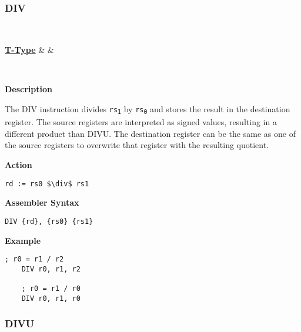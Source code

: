 \subsubsection{DIV }\label{sec:DIV}

\vspace{3ex}

\begin{center}
	\begin{bytefield}[leftcurly=., leftcurlyspace=0pt]{32}
		 \\
		\begin{leftwordgroup}{\hyperref[sec:t-type]{\textbf{T-Type}}}
		 & 
		 &
		\end{leftwordgroup}\\
	\end{bytefield}
\end{center}

\textbf{Description}

The DIV instruction divides \texttt{rs\textsubscript{1}} by \texttt{rs\textsubscript{0}} and stores the result in the destination register.
The source registers are interpreted as signed values, resulting in a different product than DIVU.
The destination register can be the same as one of the source registers to overwrite that register with the resulting quotient.
\vspace{3ex}

\textbf{Action}
\begin{lstlisting}[frame=single]
	rd := rs0 $\div$ rs1
\end{lstlisting}

\vspace{3ex}

\textbf{Assembler Syntax}
\begin{lstlisting}[frame=single]
	DIV {rd}, {rs0} {rs1}
\end{lstlisting}

\vspace{3ex}

\textbf{Example}
\begin{lstlisting}[frame=single]
	; r0 = r1 / r2
	DIV r0, r1, r2
	
	; r0 = r1 / r0
	DIV r0, r1, r0
\end{lstlisting}

\subsubsection{DIVU }\label{sec:DIVU}

